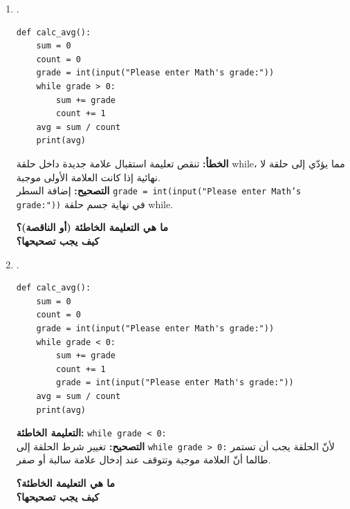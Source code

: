 \documentclass[14pt]{extarticle}
\begin{document}
\begin{enumerate}[label=\textbf{السؤال \arabic*:}, wide=0pt, itemsep=2.2em]
\begin{enumerate}[label=\textbf{مقطع \alph*:}, wide=0pt, itemsep=1.5em]
\item .
\begin{boxCode}
\begin{english}
\begin{verbatim}
def calc_avg():
    sum = 0
    count = 0
    grade = int(input("Please enter Math's grade:"))
    while grade > 0:
        sum += grade
        count += 1
    avg = sum / count
    print(avg)
\end{verbatim}
\end{english}
\end{boxCode}
\ifwithsols
\begin{boxSolution}
\textbf{الخطأ:} تنقص تعليمة استقبال علامة جديدة داخل حلقة \textenglish{while}، مما يؤدّي إلى حلقة لا نهائية إذا كانت العلامة الأولى موجبة. \\
\textbf{التصحيح:} إضافة السطر \textenglish{\texttt{grade = int(input("Please enter Math's grade:"))}} في نهاية جسم حلقة \textenglish{while}.
\end{boxSolution}
\else
\textbf{ما هي التعليمة الخاطئة (أو الناقصة)؟} \underline{\hspace{8.5cm}} \\
\textbf{كيف يجب تصحيحها؟} \underline{\hspace{10cm}}
\fi
\filbreak

\item .
\begin{boxCode}
\begin{english}
\begin{verbatim}
def calc_avg():
    sum = 0
    count = 0
    grade = int(input("Please enter Math's grade:"))
    while grade < 0:
        sum += grade
        count += 1
        grade = int(input("Please enter Math's grade:"))
    avg = sum / count
    print(avg)
\end{verbatim}
\end{english}
\end{boxCode}
\ifwithsols
\begin{boxSolution}
\textbf{التعليمة الخاطئة:} \textenglish{\texttt{while grade < 0:}} \\
\textbf{التصحيح:} تغيير شرط الحلقة إلى \textenglish{\texttt{while grade > 0:}} لأنّ الحلقة يجب أن تستمر طالما أنّ العلامة موجبة وتتوقف عند إدخال علامة سالبة أو صفر.
\end{boxSolution}
\else
\textbf{ما هي التعليمة الخاطئة؟} \underline{\hspace{9.5cm}} \\
\textbf{كيف يجب تصحيحها؟} \underline{\hspace{10cm}}
\fi
\filbreak


\end{enumerate}
\end{enumerate}
\end{document}
